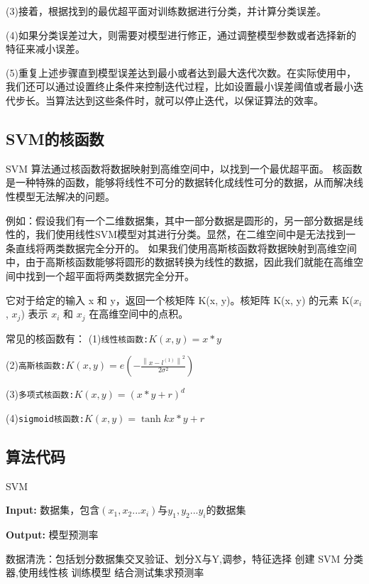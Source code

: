 \documentclass[supercite]{Experimental_Report}
\theoremstyle{definition}
\begin{document}
(3)接着，根据找到的最优超平面对训练数据进行分类，并计算分类误差。

(4)如果分类误差过大，则需要对模型进行修正，通过调整模型参数或者选择新的特征来减小误差。

(5)重复上述步骤直到模型误差达到最小或者达到最大迭代次数。在实际使用中，我们还可以通过设置终止条件来控制迭代过程，比如设置最小误差阈值或者最小迭代步长。当算法达到这些条件时，就可以停止迭代，以保证算法的效率。

\subsection{SVM的核函数}
SVM 算法通过核函数将数据映射到高维空间中，以找到一个最优超平面。
核函数是一种特殊的函数，能够将线性不可分的数据转化成线性可分的数据，从而解决线性模型无法解决的问题。

例如：假设我们有一个二维数据集，其中一部分数据是圆形的，另一部分数据是线性的，我们使用线性SVM模型对其进行分类。显然，在二维空间中是无法找到一条直线将两类数据完全分开的。
如果我们使用高斯核函数将数据映射到高维空间中，由于高斯核函数能够将圆形的数据转换为线性的数据，因此我们就能在高维空间中找到一个超平面将两类数据完全分开。

它对于给定的输入 x 和 y，返回一个核矩阵 K(x, y)。核矩阵 K(x, y) 的元素 K($x_i$, $x_j$) 表示 $x_i$ 和 $x_j$ 在高维空间中的点积。

常见的核函数有：
(1)\texttt{线性核函数:$K(x,y) = x * y$}

(2)\texttt{高斯核函数:$K(x,y)=e\left(-\frac{\left\|x-l^{(1)}\right\|^{2}}{2 \sigma^{2}}\right)$}

(3)\texttt{多项式核函数:$K(x,y)=(x*y+r)^d$}

(4)\texttt{sigmoid核函数:$K(x,y)=\tanh{kx * y + r}$}
\subsection{算法代码}
\begin{algorithm}[htb]
\caption{SVM}
\label{alg:F4}
\hspace*{0.02in} {\bf Input:}
数据集，包含$(x_1,x_2...x_i)$与$y_1,y_2...y_i$的数据集

\hspace*{0.02in} {\bf Output:} 模型预测率
  \begin{algorithmic}[1]
    \State
        数据清洗：包括划分数据集交叉验证、划分X与Y,调参，特征选择
    \State
        创建 SVM 分类器,使用线性核
    \State
        训练模型
    \State
        结合测试集求预测率
  \end{algorithmic}
\end{algorithm}
\clearpage
\end{document}
